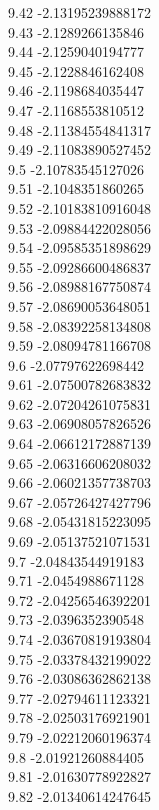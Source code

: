{9.42	-2.13195239888172\\
9.43	-2.1289266135846\\
9.44	-2.1259040194777\\
9.45	-2.1228846162408\\
9.46	-2.1198684035447\\
9.47	-2.1168553810512\\
9.48	-2.11384554841317\\
9.49	-2.11083890527452\\
9.5	-2.10783545127026\\
9.51	-2.1048351860265\\
9.52	-2.10183810916048\\
9.53	-2.09884422028056\\
9.54	-2.09585351898629\\
9.55	-2.09286600486837\\
9.56	-2.08988167750874\\
9.57	-2.08690053648051\\
9.58	-2.08392258134808\\
9.59	-2.08094781166708\\
9.6	-2.07797622698442\\
9.61	-2.07500782683832\\
9.62	-2.07204261075831\\
9.63	-2.06908057826526\\
9.64	-2.06612172887139\\
9.65	-2.06316606208032\\
9.66	-2.06021357738703\\
9.67	-2.05726427427796\\
9.68	-2.05431815223095\\
9.69	-2.05137521071531\\
9.7	-2.04843544919183\\
9.71	-2.0454988671128\\
9.72	-2.04256546392201\\
9.73	-2.0396352390548\\
9.74	-2.03670819193804\\
9.75	-2.03378432199022\\
9.76	-2.03086362862138\\
9.77	-2.02794611123321\\
9.78	-2.02503176921901\\
9.79	-2.02212060196374\\
9.8	-2.01921260884405\\
9.81	-2.01630778922827\\
9.82	-2.01340614247645\\
}
